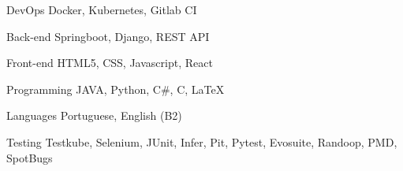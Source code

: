 

\begin{cvskills}

  \cvskill
    {DevOps} %
    {Docker, Kubernetes, Gitlab CI} %

  \cvskill
    {Back-end} %
    {Springboot, Django, REST API} %

  \cvskill
    {Front-end} %
    {HTML5, CSS, Javascript, React} %

  \cvskill
    {Programming} %
    {JAVA, Python, C\#, C, LaTeX} %

  \cvskill
    {Languages} %
    {Portuguese, English (B2)} %
    
  \cvskill
    {Testing} %
    {Testkube, Selenium, JUnit, Infer, Pit, Pytest, Evosuite, Randoop, PMD, SpotBugs} %

\end{cvskills}
